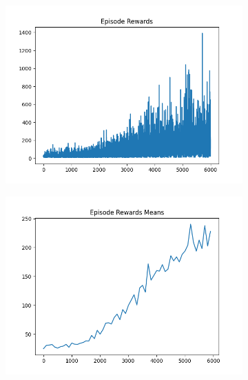 \begin{figure}[H]
\begin{subfigure}{.47\linewidth}
        \includegraphics[width=\textwidth]{pole/2024-06-14_00-20-45_dqn_cartpole_episode_rewards.png}
    \end{subfigure}
    \begin{subfigure}{.47\linewidth}
        \centering
        \includegraphics[width=\textwidth]{pole/2024-06-14_00-20-45_dqn_cartpole_episode_rewards_means.png}
    \end{subfigure}
\end{figure}
